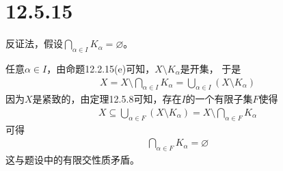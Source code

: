 \documentclass{article}
\begin{document}
\section*{12.5.15}

反证法，假设$\bigcap\limits_{\alpha \in I} K_{\alpha} = \varnothing$。

任意$\alpha \in I$，由命题12.2.15(e)可知，$X \setminus K_{\alpha}$是开集，
于是
\begin{align*}
  X = X \setminus \bigcap\limits_{\alpha \in I} K_{\alpha} = \bigcup\limits_{\alpha \in I} (X \setminus K_{\alpha}) 
\end{align*}
因为$X$是紧致的，由定理12.5.8可知，存在$I$的一个有限子集$F$使得
\begin{align*}
  X \subseteq \bigcup\limits_{\alpha \in F} (X \setminus K_{\alpha}) = X \setminus \bigcap\limits_{\alpha \in F} K_{\alpha}
\end{align*}
可得
\begin{align*}
  \bigcap\limits_{\alpha \in F} K_{\alpha} = \varnothing
\end{align*}
这与题设中的有限交性质矛盾。
\end{document}
